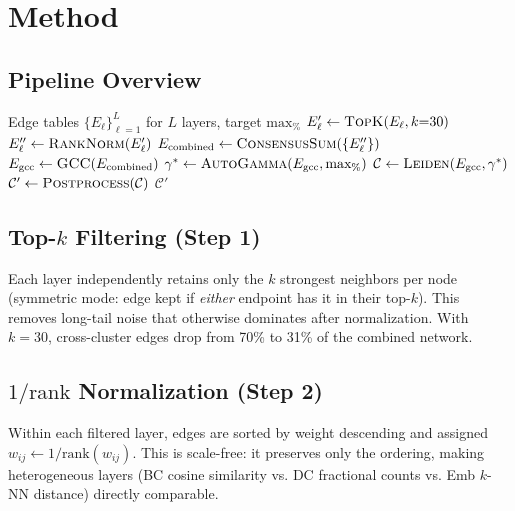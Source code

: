 \documentclass[11pt,a4paper]{article}
\begin{document}
\section{Method}

\subsection{Pipeline Overview}

\begin{algorithm}[h]
\caption{Consensus Multi-Layer Combination}
\begin{algorithmic}[1]
\REQUIRE Edge tables $\{E_\ell\}_{\ell=1}^{L}$ for $L$ layers, target $\text{max}_\%$
    \STATE $E_\ell' \leftarrow \textsc{TopK}(E_\ell, k{=}30)$ 
    \STATE $E_\ell'' \leftarrow \textsc{RankNorm}(E_\ell')$ 
\ENDFOR
\STATE $E_{\text{combined}} \leftarrow \textsc{ConsensusSum}(\{E_\ell''\})$ 
\STATE $E_{\text{gcc}} \leftarrow \textsc{GCC}(E_{\text{combined}})$ 
\STATE $\gamma^* \leftarrow \textsc{AutoGamma}(E_{\text{gcc}}, \text{max}_\%)$ 
\STATE $\mathcal{C} \leftarrow \textsc{Leiden}(E_{\text{gcc}}, \gamma^*)$
\STATE $\mathcal{C}' \leftarrow \textsc{Postprocess}(\mathcal{C})$ 
\RETURN $\mathcal{C}'$
\end{algorithmic}
\end{algorithm}

\subsection{Top-$k$ Filtering (Step 1)}

Each layer independently retains only the $k$ strongest neighbors per node (symmetric mode: edge kept if \emph{either} endpoint has it in their top-$k$). This removes long-tail noise that otherwise dominates after normalization. With $k{=}30$, cross-cluster edges drop from 70\% to 31\% of the combined network.

\subsection{$1/\text{rank}$ Normalization (Step 2)}

Within each filtered layer, edges are sorted by weight descending and assigned $w_{ij} \leftarrow 1/\text{rank}(w_{ij})$. This is scale-free: it preserves only the ordering, making heterogeneous layers (BC cosine similarity vs. DC fractional counts vs. Emb $k$-NN distance) directly comparable.
\end{document}
